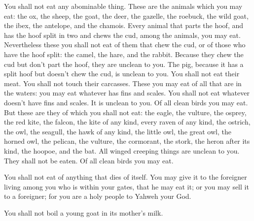  You shall not eat any abominable thing.  These
are the animals which you may eat: the ox, the sheep, the goat,
 the deer, the gazelle, the roebuck, the wild goat, the
ibex, the antelope, and the chamois.  Every animal that
parts the hoof, and has the hoof split in two and chews the cud, among
the animals, you may eat.  Nevertheless these you shall not
eat of them that chew the cud, or of those who have the hoof split: the
camel, the hare, and the rabbit. Because they chew the cud but don't
part the hoof, they are unclean to you.  The pig, because it
has a split hoof but doesn't chew the cud, is unclean to you. You shall
not eat their meat. You shall not touch their carcasses. 
These you may eat of all that are in the waters: you may eat whatever
has fins and scales.  You shall not eat whatever doesn't
have fins and scales. It is unclean to you.  Of all clean
birds you may eat.  But these are they of which you shall
not eat: the eagle, the vulture, the osprey,  the red kite,
the falcon, the kite of any kind,  every raven of any kind,
 the ostrich, the owl, the seagull, the hawk of any kind,
 the little owl, the great owl, the horned owl,
 the pelican, the vulture, the cormorant,  the
stork, the heron after its kind, the hoopoe, and the bat. 
All winged creeping things are unclean to you. They shall not be eaten.
 Of all clean birds you may eat.

 You shall not eat of anything that dies of itself. You may
give it to the foreigner living among you who is within your gates, that
he may eat it; or you may sell it to a foreigner; for you are a holy
people to Yahweh your God.

You shall not boil a young goat in its mother's milk.


